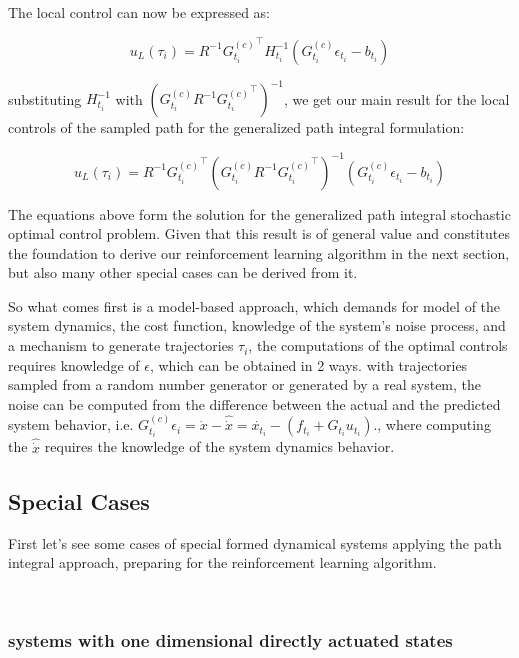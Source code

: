 \documentclass[journal]{IEEEtran}
\begin{document}
The local control can now be expressed as:

\begin{equation}
  u_L(\tau_i) = R^{-1} {G_{t_i}^{(c)}}^{\top} H_{t_i}^{-1}(G_{t_i}^{(c)}\epsilon_{t_i} - b_{t_i})
\end{equation}


substituting $H_{t_i}^{-1}$ with $({G_{t_i}^{(c)}} R^{-1} {G_{t_i}^{(c)}}^{\top})^{-1}$, we get our main result for the local 
controls of the sampled path for the generalized path integral formulation:

\begin{equation}
  u_L(\tau_i) = R^{-1} {G_{t_i}^{(c)}}^{\top} ({G_{t_i}^{(c)}} R^{-1} {G_{t_i}^{(c)}}^{\top})^{-1}(G_{t_i}^{(c)}\epsilon_{t_i} - b_{t_i})
\end{equation}



The equations above form the solution for the generalized path integral stochastic optimal control problem.
 Given that this result is of general value and constitutes the foundation to derive our reinforcement learning algorithm in the next section,
 but also many other special cases can be derived from it.

 So what comes first is a model-based approach, which demands for model of the system dynamics, the cost function, knowledge of the system’s noise process, 
 and a mechanism to generate trajectories $\tau_i$, the computations of the optimal controls requires knowledge of $\epsilon$, which can be obtained in 2 ways.
 with trajectories sampled from a random number generator or generated by a real system, the noise can be computed from the difference between the actual and the 
 predicted system behavior, i.e. $G_{t_i}^{(c)}\epsilon_i = \dot{x}   - \hat{\dot{x}}  = \dot{x_{t_i}}  - (f_{t_i} + G_{t_i} u_{t_i} ).$, where computing the $\hat{\dot{x}}$
 requires the knowledge of the system dynamics behavior.






\subsection{Special Cases}

First let's see some cases of special formed dynamical systems applying the path integral approach, preparing for the reinforcement learning algorithm.

 \ \\
\subsubsection{systems with one dimensional directly actuated states}
\ \\
\end{document}
